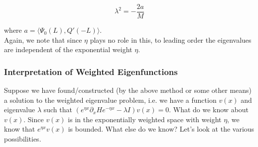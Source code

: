 \documentclass[12pt]{article}
\begin{document}
\[
\lambda^2 = -\frac{2a}{M}
\]

where $a =\langle \Psi_0 (L), Q'(-L) \rangle $.\\

Again, we note that since $\eta$ plays no role in this, to leading order the eigenvalues are independent of the exponential weight $\eta$.

\subsubsection*{Interpretation of Weighted Eigenfunctions}

Suppose we have found/constructed (by the above method or some other means) a solution to the weighted eigenvalue problem, i.e. we have a function $v(x)$ and eigenvalue $\lambda$ such that $(e^{\eta x} \partial_x H e^{-\eta x} - \lambda I)v(x) = 0$. What do we know about $v(x)$. Since $v(x)$ is in the exponentially weighted space with weight $\eta$, we know that $e^{\eta x} v(x)$ is bounded. What else do we know? Let's look at the various possibilities.
\end{document}
